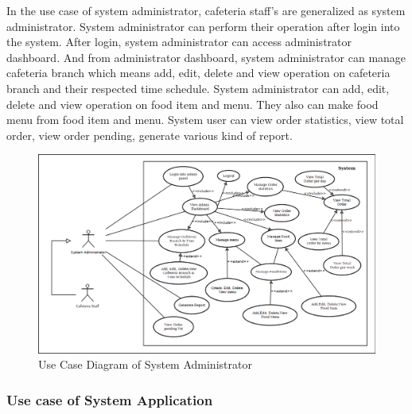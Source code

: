 In the use case of system administrator, cafeteria staff's are generalized as
system administrator.
System administrator can perform their operation after login into the system.
After login, system administrator can access administrator dashboard. And from
administrator dashboard, system administrator can manage cafeteria branch which
means add, edit, delete and view operation on cafeteria branch and their
respected time schedule. System administrator can add, edit, delete and view
operation on food item and menu.
They also can make food menu from food item and menu. System user can view order
statistics, view total order, view order pending, generate various kind of
report.
\begin{figure}[h!t]
    \centering
      \includegraphics[width=5.5in]{ch3/UseCase/SystemAdministrator}
  \caption{Use Case Diagram of System Administrator}
  \label{UCSystemAdministrator}
\end{figure}

\subsubsection{Use case of System Application}

